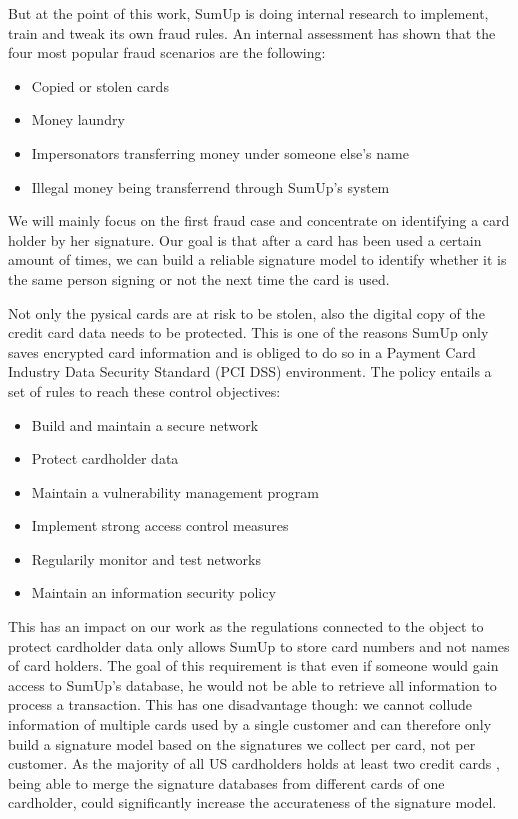 \documentclass[a4paper, oneside]{csthesis}
\begin{document}
But at the point of this work, SumUp is doing internal research to implement, train and tweak its own fraud rules. An internal assessment has shown that the four most popular fraud scenarios are the following:


\begin{itemize}
    \item Copied or stolen cards
    \item Money laundry
    \item Impersonators transferring money under someone else's name
    \item Illegal money being transferrend through SumUp's system
\end{itemize}

We will mainly focus on the first fraud case and concentrate on identifying a card holder by her signature. Our goal is that after a card has been used a certain amount of times, we can build a reliable signature model to identify whether it is the same person signing or not the next time the card is used.

Not only the pysical cards are at risk to be stolen, also the digital copy of the credit card data needs to be protected. This is one of the reasons SumUp only saves encrypted card information and is obliged to do so in a Payment Card Industry Data Security Standard (PCI DSS) environment. The policy entails a set of rules to reach these control objectives:
\begin{itemize}
\item Build and maintain a secure network
\item Protect cardholder data
\item Maintain a vulnerability management program
\item Implement strong access control measures
\item Regularily monitor and test networks
\item Maintain an information security policy
\end{itemize}

This has an impact on our work as the regulations connected to the object to protect cardholder data only allows SumUp to store card numbers and not names of card holders. The goal of this requirement is that even if someone would gain access to SumUp's database, he would not be able to retrieve all information to process a transaction. This has one disadvantage though: we cannot collude information of multiple cards used by a single customer and can therefore only build a signature model based on the signatures we collect per card, not per customer. As the majority of all US cardholders holds at least two credit cards \cite{woolsey2010credit}, being able to merge the signature databases from different cards of one cardholder, could significantly increase the accurateness of the signature model.
\end{document}
